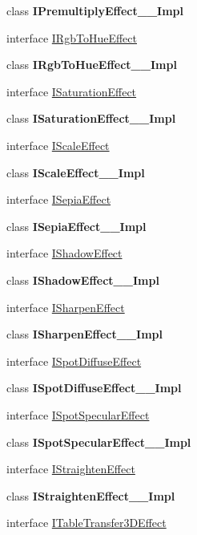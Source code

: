 \begin{DoxyCompactItemize}
class {\bfseries I\+Premultiply\+Effect\+\_\+\+\_\+\+Impl}
\item 
interface \hyperlink{interface_microsoft_1_1_graphics_1_1_canvas_1_1_effects_1_1_i_rgb_to_hue_effect}{I\+Rgb\+To\+Hue\+Effect}
\item 
class {\bfseries I\+Rgb\+To\+Hue\+Effect\+\_\+\+\_\+\+Impl}
\item 
interface \hyperlink{interface_microsoft_1_1_graphics_1_1_canvas_1_1_effects_1_1_i_saturation_effect}{I\+Saturation\+Effect}
\item 
class {\bfseries I\+Saturation\+Effect\+\_\+\+\_\+\+Impl}
\item 
interface \hyperlink{interface_microsoft_1_1_graphics_1_1_canvas_1_1_effects_1_1_i_scale_effect}{I\+Scale\+Effect}
\item 
class {\bfseries I\+Scale\+Effect\+\_\+\+\_\+\+Impl}
\item 
interface \hyperlink{interface_microsoft_1_1_graphics_1_1_canvas_1_1_effects_1_1_i_sepia_effect}{I\+Sepia\+Effect}
\item 
class {\bfseries I\+Sepia\+Effect\+\_\+\+\_\+\+Impl}
\item 
interface \hyperlink{interface_microsoft_1_1_graphics_1_1_canvas_1_1_effects_1_1_i_shadow_effect}{I\+Shadow\+Effect}
\item 
class {\bfseries I\+Shadow\+Effect\+\_\+\+\_\+\+Impl}
\item 
interface \hyperlink{interface_microsoft_1_1_graphics_1_1_canvas_1_1_effects_1_1_i_sharpen_effect}{I\+Sharpen\+Effect}
\item 
class {\bfseries I\+Sharpen\+Effect\+\_\+\+\_\+\+Impl}
\item 
interface \hyperlink{interface_microsoft_1_1_graphics_1_1_canvas_1_1_effects_1_1_i_spot_diffuse_effect}{I\+Spot\+Diffuse\+Effect}
\item 
class {\bfseries I\+Spot\+Diffuse\+Effect\+\_\+\+\_\+\+Impl}
\item 
interface \hyperlink{interface_microsoft_1_1_graphics_1_1_canvas_1_1_effects_1_1_i_spot_specular_effect}{I\+Spot\+Specular\+Effect}
\item 
class {\bfseries I\+Spot\+Specular\+Effect\+\_\+\+\_\+\+Impl}
\item 
interface \hyperlink{interface_microsoft_1_1_graphics_1_1_canvas_1_1_effects_1_1_i_straighten_effect}{I\+Straighten\+Effect}
\item 
class {\bfseries I\+Straighten\+Effect\+\_\+\+\_\+\+Impl}
\item 
interface \hyperlink{interface_microsoft_1_1_graphics_1_1_canvas_1_1_effects_1_1_i_table_transfer3_d_effect}{I\+Table\+Transfer3\+D\+Effect}

\end{DoxyCompactItemize}
